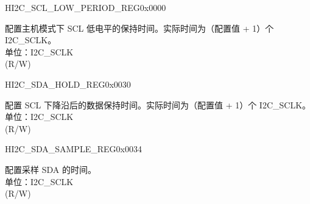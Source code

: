 \begin{register}{H}{I2C\_SCL\_LOW\_PERIOD\_REG}{0x0000}\label{regdesc:I2CSCLLOWPERIODREG}
%
%
\regnewline%
\begin{regdesc}\begin{reglist}
\label{fielddesc:I2CSCLLOWPERIOD}\item [I2C\_SCL\_LOW\_PERIOD] 配置主机模式下 SCL 低电平的保持时间。实际时间为（配置值 + 1）个 I2C\_SCLK。\\
单位：I2C\_SCLK \\ (R/W)
\end{reglist}\end{regdesc}
\end{register}


\begin{register}{H}{I2C\_SDA\_HOLD\_REG}{0x0030}\label{regdesc:I2CSDAHOLDREG}
%
%
\regnewline%
\begin{regdesc}\begin{reglist}
\label{fielddesc:I2CSDAHOLDTIME}\item [I2C\_SDA\_HOLD\_TIME] 配置 SCL 下降沿后的数据保持时间。实际时间为（配置值 + 1）个 I2C\_SCLK。\\
单位：I2C\_SCLK \\ (R/W)
\end{reglist}\end{regdesc}
\end{register}


\begin{register}{H}{I2C\_SDA\_SAMPLE\_REG}{0x0034}\label{regdesc:I2CSDASAMPLEREG}
%
%
\regnewline%
\begin{regdesc}\begin{reglist}
\label{fielddesc:I2CSDASAMPLETIME}\item [I2C\_SDA\_SAMPLE\_TIME] 配置采样 SDA 的时间。\\
单位：I2C\_SCLK \\ (R/W)
\end{reglist}\end{regdesc}
\end{register}


